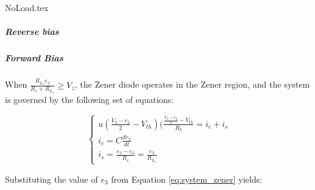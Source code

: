 {NoLoad.tex}

\iffalse
\subparagraph{Reverse bias}
\subparagraph{Forward Bias}
When $\frac{R_{L_1}e_2}{R_s+R_{L_1}} \geq V_z$, the Zener diode operates in the Zener region, and the system is governed by the following set of equations:

\begin{equation}
    \begin{cases}
        u(\frac{V_2-e_2}{2}-V_{th})(\frac{\frac{V_2-e_2}{2}-V_{th}}{R_b}=i_c+i_s\\
        i_c=C\frac{de_2}{dt}\\
        i_s=\frac{e_2-e_3}{R_s}=\frac{e_3}{R_{L_1}}
    \end{cases}
    \label{eq:system_zener}
\end{equation}

Substituting the value of $e_3$ from Equation \ref{eq:system_zener} yields:

